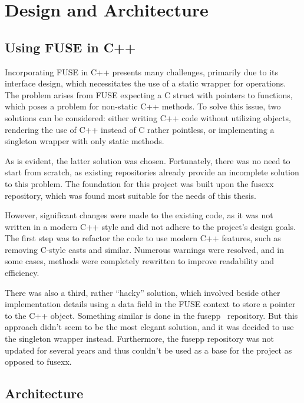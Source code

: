\chapter{Design and Architecture}
\label{chap:design-and-architecture}


\section{Using FUSE in C++}\label{sec:fuse-in-cpp}

Incorporating FUSE in C++ presents many challenges, primarily due to its interface design, which necessitates the use of a static wrapper for operations.
The problem arises from FUSE expecting a C struct with pointers to functions, which poses a problem for non-static C++ methods.
To solve this issue, two solutions can be considered: either writing C++ code without utilizing objects, rendering the use of C++ instead of C rather pointless, or implementing a singleton wrapper with only static methods.

As is evident, the latter solution was chosen.
Fortunately, there was no need to start from scratch, as existing repositories already provide an incomplete solution to this problem.
The foundation for this project was built upon the fusexx~\cite{fusexx} repository, which was found most suitable for the needs of this thesis.

However, significant changes were made to the existing code, as it was not written in a modern C++ style and did not adhere to the project's design goals.
The first step was to refactor the code to use modern C++ features, such as removing C-style casts and similar.
Numerous warnings were resolved, and in some cases, methods were completely rewritten to improve readability and efficiency.

There was also a third, rather ``hacky'' solution, which involved beside other implementation details using a data field in the FUSE context to store a pointer to the C++ object.
Something similar is done in the fusepp~\cite{fusepp} repository.
But this approach didn't seem to be the most elegant solution, and it was decided to use the singleton wrapper instead.
Furthermore, the fusepp repository was not updated for several years and thus couldn't be used as a base for the project as opposed to fusexx.


\section{Architecture}\label{sec:architecture}

